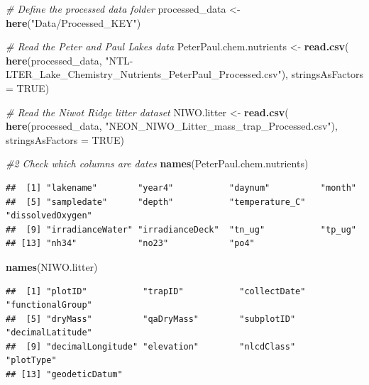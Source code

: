 \documentclass[
]{article}
\newenvironment{Shaded}{\begin{snugshade}}{\end{snugshade}}
\newcommand{\AttributeTok}[1]{\textcolor[rgb]{0.13,0.29,0.53}{#1}}
\newcommand{\CommentTok}[1]{\textcolor[rgb]{0.56,0.35,0.01}{\textit{#1}}}
\newcommand{\ConstantTok}[1]{\textcolor[rgb]{0.56,0.35,0.01}{#1}}
\newcommand{\FunctionTok}[1]{\textcolor[rgb]{0.13,0.29,0.53}{\textbf{#1}}}
\newcommand{\NormalTok}[1]{#1}
\newcommand{\OtherTok}[1]{\textcolor[rgb]{0.56,0.35,0.01}{#1}}
\newcommand{\StringTok}[1]{\textcolor[rgb]{0.31,0.60,0.02}{#1}}
\begin{document}
\begin{Shaded}
\begin{Highlighting}[]
\CommentTok{\# Define the processed data folder}
\NormalTok{processed\_data }\OtherTok{\textless{}{-}} \FunctionTok{here}\NormalTok{(}\StringTok{"Data/Processed\_KEY"}\NormalTok{)}

\CommentTok{\# Read the Peter and Paul Lakes data}
\NormalTok{PeterPaul.chem.nutrients }\OtherTok{\textless{}{-}} \FunctionTok{read.csv}\NormalTok{(}
  \FunctionTok{here}\NormalTok{(processed\_data, }\StringTok{"NTL{-}LTER\_Lake\_Chemistry\_Nutrients\_PeterPaul\_Processed.csv"}\NormalTok{),}
  \AttributeTok{stringsAsFactors =} \ConstantTok{TRUE}\NormalTok{)}

\CommentTok{\# Read the Niwot Ridge litter dataset}
\NormalTok{NIWO.litter }\OtherTok{\textless{}{-}} \FunctionTok{read.csv}\NormalTok{(}
  \FunctionTok{here}\NormalTok{(processed\_data, }\StringTok{"NEON\_NIWO\_Litter\_mass\_trap\_Processed.csv"}\NormalTok{),}
  \AttributeTok{stringsAsFactors =} \ConstantTok{TRUE}\NormalTok{)}

\CommentTok{\#2 Check which columns are dates}
\FunctionTok{names}\NormalTok{(PeterPaul.chem.nutrients)}
\end{Highlighting}
\end{Shaded}

\begin{verbatim}
##  [1] "lakename"        "year4"           "daynum"          "month"          
##  [5] "sampledate"      "depth"           "temperature_C"   "dissolvedOxygen"
##  [9] "irradianceWater" "irradianceDeck"  "tn_ug"           "tp_ug"          
## [13] "nh34"            "no23"            "po4"
\end{verbatim}

\begin{Shaded}
\begin{Highlighting}[]
\FunctionTok{names}\NormalTok{(NIWO.litter)}
\end{Highlighting}
\end{Shaded}

\begin{verbatim}
##  [1] "plotID"           "trapID"           "collectDate"      "functionalGroup" 
##  [5] "dryMass"          "qaDryMass"        "subplotID"        "decimalLatitude" 
##  [9] "decimalLongitude" "elevation"        "nlcdClass"        "plotType"        
## [13] "geodeticDatum"
\end{verbatim}
\end{document}
